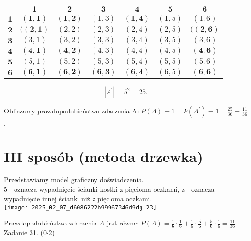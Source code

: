 \documentclass[10pt]{article}
\begin{document}
\begin{center}
\begin{tabular}{|c|c|c|c|c|c|c|}
\hline
 & $\mathbf{1}$ & $\mathbf{2}$ & $\mathbf{3}$ & $\mathbf{4}$ & $\mathbf{5}$ & $\mathbf{6}$ \\
\hline
$\mathbf{1}$ & $\mathbf{( 1 , 1 )}$ & $\mathbf{( 1 , 2 )}$ & $(1,3)$ & $\mathbf{( 1 , 4 )}$ & $(1,5)$ & $(1,6)$ \\
\hline
$\mathbf{2}$ & $(\mathbf{( 2 , 1 )}$ & $(2,2)$ & $(2,3)$ & $(2,4)$ & $(2,5)$ & $(\mathbf{( 2 , 6 )}$ \\
\hline
$\mathbf{3}$ & $(3,1)$ & $(3,2)$ & $(3,3)$ & $(3,4)$ & $(3,5)$ & $(3,6)$ \\
\hline
$\mathbf{4}$ & $\mathbf{( 4 , 1 )}$ & $\mathbf{( 4 , 2 )}$ & $(4,3)$ & $(4,4)$ & $(4,5)$ & $\mathbf{( 4 , 6 )}$ \\
\hline
$\mathbf{5}$ & $(5,1)$ & $(5,2)$ & $(5,3)$ & $(5,4)$ & $(5,5)$ & $(5,6)$ \\
\hline
$\mathbf{6}$ & $\mathbf{( 6 , 1 )}$ & $\mathbf{( 6 , 2 )}$ & $\mathbf{( 6 , 3 )}$ & $\mathbf{( 6 , 4 )}$ & $(6,5)$ & $\mathbf{( 6 , 6 )}$ \\
\hline
\end{tabular}
\end{center}

$$
\left|A^{\prime}\right|=5^{2}=25 .
$$

Obliczamy prawdopodobieństwo zdarzenia A: $P(A)=1-P\left(A^{\prime}\right)=1-\frac{25}{36}=\frac{11}{36}$.

\section*{III sposób (metoda drzewka)}
Przedstawiamy model graficzny doświadczenia.\\
5 - oznacza wypadnięcie ścianki kostki z pięcioma oczkami, z - oznacza wypadnięcie innej ścianki niż z pięcioma oczkami.\\
\texttt{[image: 2025\_02\_07\_d6086222b99967346d9dg-23]}

Prawdopodobieństwo zdarzenia $A$ jest równe: $P(A)=\frac{1}{6} \cdot \frac{1}{6}+\frac{1}{6} \cdot \frac{5}{6}+\frac{5}{6} \cdot \frac{1}{6}=\frac{11}{36}$.\\
Zadanie 31. (0-2)
\end{document}
